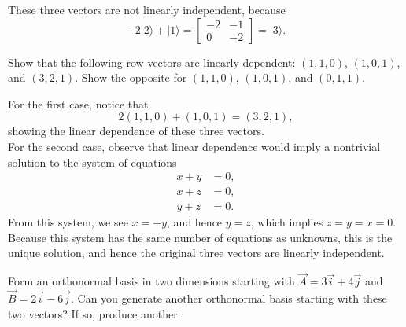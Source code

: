 \documentclass[../principles-of-quantum-mechanics.tex]{subfiles}
\begin{document}
\begin{questions}
\begin{solution}
	These three vectors are not linearly independent, because
	\[
		{-2}|2\rangle + |1\rangle = \begin{bmatrix}
		-2 & -1 \\ 0 & -2
		\end{bmatrix} = |3\rangle.
	\]
\end{solution}

\question Show that the following row vectors are linearly dependent: $(1, 1, 0)$, $(1, 0, 1)$, and $(3, 2, 1)$. Show the opposite for $(1, 1, 0)$, $(1, 0, 1)$, and $(0, 1, 1)$.

\begin{solution}
	For the first case, notice that
	\[
		2(1, 1, 0) + (1, 0, 1) = (3, 2, 1),
	\]
	showing the linear dependence of these three vectors. \\
	
	For the second case, observe that linear dependence would imply a nontrivial solution to the system of equations
	\begin{align*}
		x + y &= 0, \\
		x + z &= 0, \\
		y + z &= 0.
	\end{align*}
	From this system, we see $x = -y$, and hence $y = z$, which implies $z = y = x = 0$. Because this system has the same number of equations as unknowns, this is the unique solution, and hence the original three vectors are linearly independent.
\end{solution}

\question Form an orthonormal basis in two dimensions starting with $\vec{A} = 3\vec{i} + 4\vec{j}$ and $\vec{B} = 2\vec{i} - 6\vec{j}$. Can you generate another orthonormal basis starting with these two vectors? If so, produce another.


\end{questions}
\end{document}

